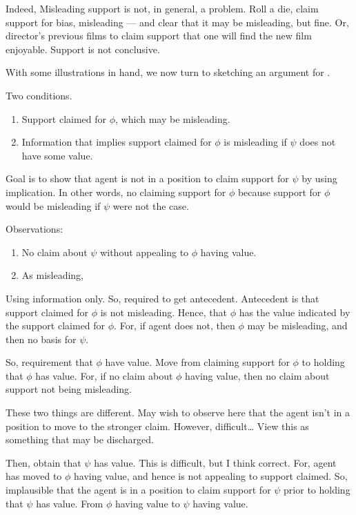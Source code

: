 \begin{note}
  Indeed, Misleading support is not, in general, a problem.
  Roll a die, claim support for bias, misleading --- and clear that it may be misleading, but fine.
  Or, director's previous films to claim support that one will find the new film enjoyable.
  Support is not conclusive.
\end{note}

\begin{note}[Explanation of \nI{}]
  With some illustrations in hand, we now turn to sketching an argument for \nI{}.

  Two conditions.
  \begin{enumerate}
  \item Support claimed for \(\phi\), which may be misleading.
  \item Information that implies support claimed for \(\phi\) is misleading if \(\psi\) does not have some value.
  \end{enumerate}
  Goal is to show that agent is not in a position to claim support for \(\psi\) by using implication.
  In other words, no claiming support for \(\phi\) because support for \(\phi\) would be misleading if \(\psi\) were not the case.

  Observations:
  \begin{enumerate}
  \item No claim about \(\psi\) without appealing to \(\phi\) having value.
  \item As misleading, 
  \end{enumerate}




  Using information only.
  So, required to get antecedent.
  Antecedent is that support claimed for \(\phi\) is not misleading.
  Hence, that \(\phi\) has the value indicated by the support claimed for \(\phi\).
  For, if agent does not, then \(\phi\) may be misleading, and then no basis for \(\psi\).

  So, requirement that \(\phi\) have value.
  Move from claiming support for \(\phi\) to holding that \(\phi\) has value.
  For, if no claim about \(\phi\) having value, then no claim about support not being misleading.

  These two things are different.
  May wish to observe here that the agent isn't in a position to move to the stronger claim.
  However, difficult\dots
  View this as something that may be discharged.

  Then, obtain that \(\psi\) has value.
  This is difficult, but I think correct.
  For, agent has moved to \(\phi\) having value, and hence is not appealing to support claimed.
  So, implausible that the agent is in a position to claim support for \(\psi\) prior to holding that \(\psi\) has value.
  From \(\phi\) having value to \(\psi\) having value.


\end{note}
